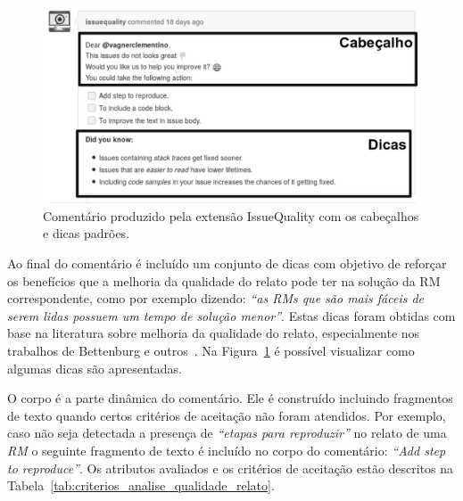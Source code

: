 \begin{figure}[htpb]
    \centering
    \includegraphics[width=0.8\linewidth]{chapter-implementacao-extensoes-fgrm/img/issue_original.png}
    \caption{Comentário produzido pela extensão IssueQuality com os cabeçalhos e
        dicas padrões.}
\label{fig:issue_original}
\end{figure}

Ao final do comentário é incluído um conjunto de dicas com objetivo de reforçar
os benefícios que a melhoria da qualidade do relato pode ter na solução da RM
correspondente, como por exemplo dizendo: \textit{``as RMs que são mais fáceis
    de serem lidas possuem um tempo de solução menor''}. Estas dicas foram
obtidas com base na literatura sobre melhoria da qualidade do relato,
especialmente nos trabalhos de Bettenburg e outros~\cite{bettenburg2007quality,
    bettenburg2008makes}. Na Figura~\ref{fig:issue_original} é possível
visualizar como algumas dicas são apresentadas.

O corpo é a parte dinâmica do comentário. Ele é construído incluindo fragmentos
de texto quando certos critérios de aceitação não foram atendidos.  Por exemplo,
caso não seja detectada a presença de \textit{``etapas para reproduzir''} no
relato de uma \textit{RM} o seguinte fragmento de texto é incluído no corpo
do comentário: \textit{``Add step to reproduce''}. Os atributos avaliados e os
critérios de aceitação estão descritos na
Tabela~\ref{tab:criterios_analise_qualidade_relato}.

